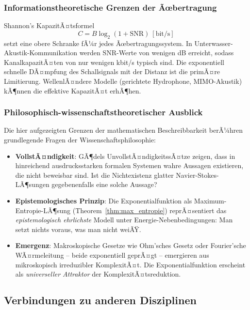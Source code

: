 ﻿\documentclass[12pt,a4paper]{article}
\theoremstyle{definition}
\theoremstyle{remark}
\begin{document}
\subsubsection{Informationstheoretische Grenzen der Ãœbertragung}

Shannon's KapazitÃ¤tsformel
\begin{equation}
C = B\log_2\left(1 + \text{SNR}\right)~[\text{bit/s}]
\end{equation}
setzt eine obere Schranke fÃ¼r jedes Ãœbertragungssystem. In Unterwasser-Akustik-Kommu\-nikation werden SNR-Werte von wenigen dB erreicht, sodass KanalkapazitÃ¤ten von nur wenigen kbit/s typisch sind. Die exponentiell schnelle DÃ¤mpfung des Schallsignals mit der Distanz ist die primÃ¤re Limitierung. WellenlÃ¤ndere Modelle (gerichtete Hydrophone, MIMO-Akustik) kÃ¶nnen die effektive KapazitÃ¤t erhÃ¶hen.

\subsubsection{Philosophisch-wissenschaftstheoretischer Ausblick}

Die hier aufgezeigten Grenzen der mathematischen Beschreibbarkeit berÃ¼hren grundlegende Fragen der Wissenschaftsphilosophie:

\begin{itemize}
\item \textbf{VollstÃ¤ndigkeit}: GÃ¶dels UnvollstÃ¤ndigkeitssÃ¤tze zeigen, dass in hinreichend ausdrucksstarken formalen Systemen wahre Aussagen existieren, die nicht beweisbar sind. Ist die Nichtexistenz glatter Navier-Stokes-LÃ¶sungen gegebenenfalls eine solche Aussage?
\item \textbf{Epistemologisches Prinzip}: Die Exponentialfunktion als Maximum-Entropie-LÃ¶\-sung (Theorem~\ref{thm:max_entropie}) reprÃ¤sentiert das \emph{epistemologisch ehrlichste} Modell unter Ener\-gie-Nebenbedingungen: Man setzt nichts voraus, was man nicht weiÃŸ.
\item \textbf{Emergenz}: Makroskopische Gesetze wie Ohm'sches Gesetz oder Fourier'sche WÃ¤r\-me\-leitung -- beide exponentiell geprÃ¤gt -- emergieren aus mikroskopisch irreduzibler KomplexitÃ¤t. Die Exponentialfunktion erscheint als \emph{universeller Attraktor} der KomplexitÃ¤tsreduktion.
\end{itemize}

\subsection{Verbindungen zu anderen Disziplinen}
\end{document}

